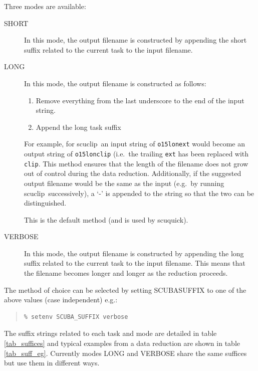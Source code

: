 \documentclass[twoside,11pt]{article}
\newcommand{\task}[1]{{\sf #1}}
\newcommand{\scuquick}{\htmlref{\task{scuquick}}{SCUQUICK}}
\newcommand{\scuclip}{\htmlref{\task{scuclip}}{SCUCLIP}}
\newenvironment{myquote}{\begin{quote}\begin{small}}{\end{small}\end{quote}}
\newcommand{\htmlref}[2]{#1}
\renewcommand{\_}{\texttt{\symbol{95}}}
\begin{document}
Three modes are available:
\begin{description}

\item[\textsf{SHORT}] \mbox{}

In this mode, the output filename is constructed by appending the short
suffix related to the current task to the input filename. 

\item[\textsf{LONG}] \mbox{}

In this mode, the output filename is constructed as follows:
\begin{enumerate}
\item Remove everything from the last underscore to the end of the input
string. 
\item Append the long task suffix
\end{enumerate}

For example, for \scuclip\ an input string of \texttt{o15\_lon\_ext} would
become an output string of \texttt{o15\_lon\_clip} (i.e.\ the trailing
\texttt{\_ext} has been replaced with \texttt{\_clip}. This method ensures
that the length of the filename does not grow out of control during the data
reduction. Additionally, if the suggested output filename would be the same as 
the input (e.g.\ by running \scuclip\ successively), a `-' is appended to
the string so that the two can be distinguished.

This is the default method (and is used by \scuquick).

\item[\textsf{VERBOSE}] \mbox{}

In this mode, the output filename is constructed by appending the long suffix
related to the current task to the input filename. This means that
the filename becomes longer and longer as the reduction proceeds.

\end{description}

The method of choice can be selected by setting SCUBA\_SUFFIX to one of the
above values (case independent) e.g.:
\begin{myquote}
\begin{verbatim}
% setenv SCUBA_SUFFIX verbose
\end{verbatim}
\end{myquote}
The suffix strings related to each task and mode are detailed in table
\ref{tab_suffices} and typical examples from a data reduction are shown in
table \ref{tab_suff_eg}. Currently modes \textsf{LONG} and \textsf{VERBOSE}
share the same suffices but use them in different ways.
\end{document}
